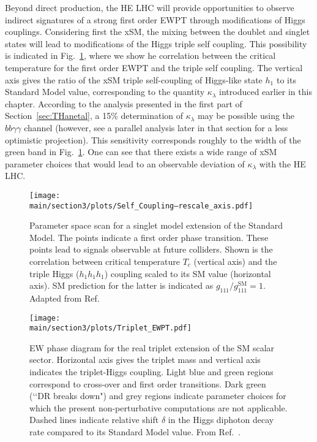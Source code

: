 Beyond direct production, the HE LHC will provide opportunities to observe indirect signatures of a strong first order EWPT through modifications of Higgs couplings. Considering first the xSM, the mixing between the doublet and singlet states will lead to modifications of the Higgs triple self coupling. This possibility is indicated in Fig.~\ref{fig:ewpt_self}, where we show he correlation between the critical temperature for the first order EWPT and the triple self coupling. The vertical axis gives the ratio of the xSM triple self-coupling of Higgs-like state $h_1$ to its Standard Model value, corresponding to the quantity $\kappa_\lambda$  introduced earlier in this chapter.  According to the analysis presented in the first part of Section~\ref{sec:THanetal}, a 15\% determination of $\kappa_\lambda$ may be possible using the $bb\gamma\gamma$ channel (however, see a parallel analysis later in that section for a less optimistic projection). This sensitivity corresponds roughly to the width of the green band in Fig.~\ref{fig:ewpt_self}. One can see that there exists a wide range of xSM parameter choices that would lead to an observable deviation of $\kappa_\lambda$ with the HE LHC.

\begin{figure}[hbtp]
  \begin{center}
    \texttt{[image: \\main/section3/plots/Self\_Coupling--rescale\_axis.pdf]}
    \caption{
    Parameter space scan for a singlet model extension of the Standard Model. The points indicate a first order phase transition. These points lead to signals observable at future colliders. Shown is the correlation between critical temperature $T_c$ (vertical axis) and the triple Higgs ($h_1 h_1 h_1$) coupling scaled to its SM value (horizontal axis). SM prediction for the latter is indicated as $g_{111}/g_{111}^\mathrm{SM}=1$. Adapted from Ref.~\cite{Profumo:2014opa}   
        }
    \label{fig:ewpt_self}
  \end{center}
\end{figure}

\begin{figure}[hbtp]
  \begin{center}
  \texttt{[image: \\main/section3/plots/Triplet\_EWPT.pdf]}
    \caption{
    EW phase diagram for the real triplet extension of the SM scalar sector. Horizontal axis gives the triplet mass and vertical axis indicates the triplet-Higgs coupling. Light blue and green regions correspond to cross-over and first order transitions. Dark green (\lq\lq DR breaks down") and grey regions indicate parameter choices for which the present non-perturbative computations are not applicable. Dashed lines indicate relative shift $\delta$ in the Higgs diphoton decay rate compared to its Standard Model value. From Ref.~\cite{Niemi:2018asa}.    
        }
    \label{fig:ewpt_triplet}
  \end{center}
\end{figure}

